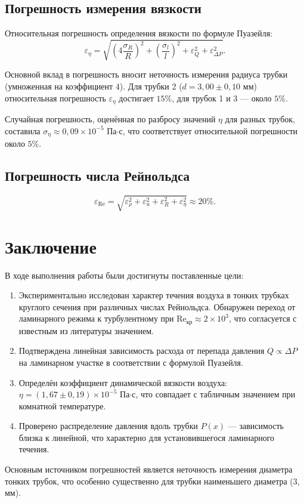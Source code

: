 \documentclass[14pt]{article}
\begin{document}
\subsection*{Погрешность измерения вязкости}

Относительная погрешность определения вязкости по формуле Пуазейля:
\begin{equation}
	\varepsilon_\eta = \sqrt{\left(4 \frac{\sigma_R}{R}\right)^2 + \left(\frac{\sigma_l}{l}\right)^2 + \varepsilon_Q^2 + \varepsilon_{\Delta P}^2}.
\end{equation}

Основной вклад в погрешность вносит неточность измерения радиуса трубки (умноженная на коэффициент 4). Для трубки 2 ($d = 3,\!00 \pm 0,\!10$ мм) относительная погрешность $\varepsilon_\eta$ достигает $15\%$, для трубок 1 и 3 — около $5\%$.

Случайная погрешность, оценённая по разбросу значений $\eta$ для разных трубок, составила $\sigma_\eta \approx 0,\!09 \times 10^{-5}$ Па$\cdot$с, что соответствует относительной погрешности около $5\%$.

\subsection*{Погрешность числа Рейнольдса}

\begin{equation}
	\varepsilon_{\text{Re}} = \sqrt{\varepsilon_\rho^2 + \varepsilon_u^2 + \varepsilon_R^2 + \varepsilon_\eta^2} \approx 20\%.
\end{equation}

\section*{Заключение}

\hspace{4mm} В ходе выполнения работы были достигнуты поставленные цели:

\begin{enumerate}
	\item Экспериментально исследован характер течения воздуха в тонких трубках круглого сечения при различных числах Рейнольдса. Обнаружен переход от ламинарного режима к турбулентному при $\text{Re}_{\text{кр}} \approx 2 \times 10^3$, что согласуется с известным из литературы значением.
	\item Подтверждена линейная зависимость расхода от перепада давления $Q \propto \Delta P$ на ламинарном участке в соответствии с формулой Пуазейля.
	\item Определён коэффициент динамической вязкости воздуха: $\eta = (1,\!67 \pm 0,\!19) \times 10^{-5}$ Па$\cdot$с, что совпадает с табличным значением при комнатной температуре.
	\item Проверено распределение давления вдоль трубки $P(x)$ — зависимость близка к линейной, что характерно для установившегося ламинарного течения.
\end{enumerate}

Основным источником погрешностей является неточность измерения диаметра тонких трубок, что особенно существенно для трубки наименьшего диаметра (3, мм).
\end{document}
